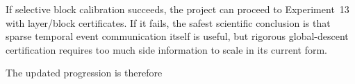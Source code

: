 If selective block calibration succeeds, the project can proceed to Experiment~13 with layer/block certificates. If it fails, the safest scientific conclusion is that sparse temporal event communication itself is useful, but rigorous global-descent certification requires too much side information to scale in its current form.

The updated progression is therefore
\begin{center}
\end{center}
